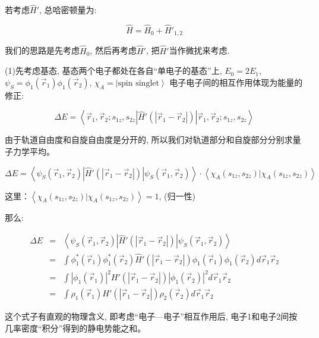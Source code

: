 若考虑$\hat H'$, 总哈密顿量为:

\begin{equation*}
    \hat H = \hat H_0 + \hat H'_{1,2}
\end{equation*}

我们的思路是先考虑$\hat H_0$, 然后再考虑$\hat H'$, 把$\hat
H'$当作微扰来考虑.

(1)先考虑基态, 基态两个电子都处在各自``单电子的基态''上, $E_0 =
2E_1$, $\psi_S= \phi_1(\vec r_1)\phi_1(\vec r_2)$, $\chi_A = \left|
\text{spin singlet} \right\rangle$
电子电子间的相互作用体现为能量的修正:

\begin{equation*}
    \Delta E = \left\langle {\vec r_1, \vec r_2; s_{1z}, s_{2z}} \left| \hat H'(|\vec r_1 - \vec r_2|) \right| {\vec r_1, \vec r_2; s_{1z}, s_{2z}} \right\rangle
\end{equation*}

由于轨道自由度和自旋自由度是分开的,
所以我们对轨道部分和自旋部分分别求量子力学平均。

\begin{equation*}
\Delta E = \left\langle {\psi_S( \vec r_1, \vec r_2)} \left| \hat
H'(|\vec r_1 - \vec r_2|) \right| {\psi_S(\vec r_1, \vec r_2)}
\right\rangle \cdot \left\langle \chi_A(s_{1z},s_{2z}) |
\chi_A(s_{1z},s_{2z}) \right\rangle
\end{equation*}

这里：$\left\langle \chi_A(s_{1z},s_{2z}) | \chi_A(s_{1z},s_{2z})
\right\rangle =1 $, (归一性)

那么:

\begin{eqnarray*}
  \Delta E &=& \left\langle {\psi_S( \vec r_1, \vec r_2)} \left| \hat
H'(|\vec r_1 - \vec r_2|) \right| {\psi_S(\vec r_1, \vec r_2)}
\right\rangle \\
  {} &=& \int \phi_1^*(\vec r_1) \phi_1^*(\vec r_2) \hat H'(|\vec r_1 - \vec
  r_2|) \phi_1(\vec r_1) \phi_1(\vec r_2) d \vec r_1 \vec r_2 \\
  {} &=& \int |\phi_1(\vec r_1)|^2 H'(|\vec r_1 - \vec
  r_2|) |\phi_1(\vec r_2)|^2 d \vec r_1 \vec r_2 \\
  {} &=& \int \rho_1(\vec r_1) H'(|\vec r_1 - \vec r_2|) \rho_2(\vec r_2) d \vec r_1 \vec r_2
\end{eqnarray*}

这个式子有直观的物理含义, 即考虑``电子---电子''相互作用后,
电子1和电子2间按几率密度``积分''得到的静电势能之和。

